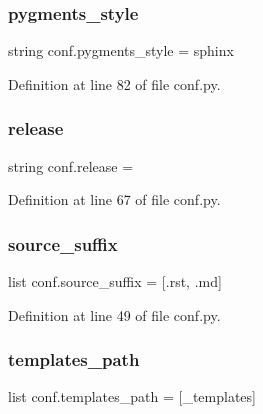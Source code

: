 \subsubsection{\texorpdfstring{pygments\+\_\+style}{pygments\_style}}
{\footnotesize\ttfamily string conf.\+pygments\+\_\+style = \textquotesingle{}sphinx\textquotesingle{}}



Definition at line 82 of file conf.\+py.

\mbox{\label{namespaceconf_a325dc746d8bf05c54d26351c35a21d90}} 
\subsubsection{\texorpdfstring{release}{release}}
{\footnotesize\ttfamily string conf.\+release = \textquotesingle{}\textquotesingle{}}



Definition at line 67 of file conf.\+py.

\mbox{\label{namespaceconf_a3cb6867401ccd3f25a28d4270f4703c1}} 
\subsubsection{\texorpdfstring{source\+\_\+suffix}{source\_suffix}}
{\footnotesize\ttfamily list conf.\+source\+\_\+suffix = \mbox{[}\textquotesingle{}.rst\textquotesingle{}, \textquotesingle{}.md\textquotesingle{}\mbox{]}}



Definition at line 49 of file conf.\+py.

\mbox{\label{namespaceconf_ae850ae634911b713e036b43894fdd525}} 
\subsubsection{\texorpdfstring{templates\+\_\+path}{templates\_path}}
{\footnotesize\ttfamily list conf.\+templates\+\_\+path = \mbox{[}\textquotesingle{}\+\_\+templates\textquotesingle{}\mbox{]}}




